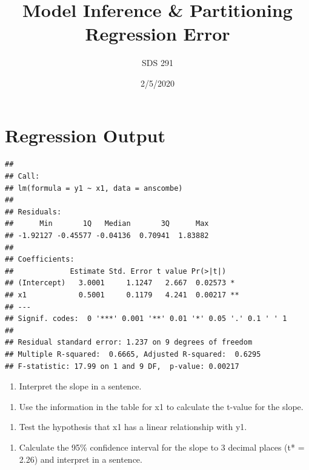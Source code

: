 \documentclass[]{article}
\title{Model Inference \& Partitioning Regression Error}
\author{SDS 291}
\date{2/5/2020}
\providecommand{\tightlist}{%
  \setlength{\itemsep}{0pt}\setlength{\parskip}{0pt}}
\begin{document}
\maketitle

\hypertarget{regression-output}{%
\section{Regression Output}\label{regression-output}}

\begin{verbatim}
## 
## Call:
## lm(formula = y1 ~ x1, data = anscombe)
## 
## Residuals:
##      Min       1Q   Median       3Q      Max 
## -1.92127 -0.45577 -0.04136  0.70941  1.83882 
## 
## Coefficients:
##             Estimate Std. Error t value Pr(>|t|)   
## (Intercept)   3.0001     1.1247   2.667  0.02573 * 
## x1            0.5001     0.1179   4.241  0.00217 **
## ---
## Signif. codes:  0 '***' 0.001 '**' 0.01 '*' 0.05 '.' 0.1 ' ' 1
## 
## Residual standard error: 1.237 on 9 degrees of freedom
## Multiple R-squared:  0.6665, Adjusted R-squared:  0.6295 
## F-statistic: 17.99 on 1 and 9 DF,  p-value: 0.00217
\end{verbatim}

\begin{enumerate}
\def\labelenumi{\arabic{enumi}.}
\tightlist
\item
  Interpret the slope in a sentence.
\end{enumerate}

\vspace{1 in}

\begin{enumerate}
\def\labelenumi{\arabic{enumi}.}
\setcounter{enumi}{1}
\tightlist
\item
  Use the information in the table for x1 to calculate the t-value for
  the slope.
\end{enumerate}

\vspace{1 in}

\begin{enumerate}
\def\labelenumi{\arabic{enumi}.}
\setcounter{enumi}{1}
\tightlist
\item
  Test the hypothesis that x1 has a linear relationship with y1.
\end{enumerate}

\vspace{1 in}

\begin{enumerate}
\def\labelenumi{\arabic{enumi}.}
\setcounter{enumi}{2}
\tightlist
\item
  Calculate the 95\% confidence interval for the slope to 3 decimal
  places (t* = 2.26) and interpret in a sentence.
\end{enumerate}
\end{document}
